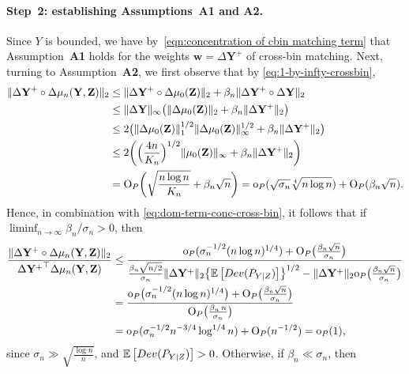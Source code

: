 \documentclass[12pt]{article}
\newcommand{\EE}[1]{\mathbb{E}\left[{#1}\right]}
\newcommand{\bY}{\mathbf{Y}}
\newcommand{\bZ}{\mathbf{Z}}
\newcommand{\bw}{\mathbf{w}}
\begin{document}
    \paragraph{Step~2: establishing Assumptions~\textbf{A1} and \textbf{A2}.}
    Since $Y$ is bounded, we have by~\eqref{eqn:concentration of cbin matching term} that Assumption~\textbf{A1} holds for the weights $\bw = \Delta\bY^+$ of cross-bin matching. Next, turning to Assumption~\textbf{A2}, we
    first observe that by \eqref{eq:1-by-infty-crossbin},
    \begin{align}\label{eq:cross_bin_DelY_Delmu_0_bd}
        \|\Delta\bY^+\circ \Delta\mu_n(\bY,\bZ)\|_2&\leq \|\Delta\bY^+\circ \Delta\mu_0(\bZ)\|_2+\beta_n\|\Delta\bY^+\circ \Delta\bY\|_2\notag\\
        &\leq \|\Delta\bY\|_\infty\bigl(\|\Delta\mu_0(\bZ)\|_2 +\beta_n\|\Delta\bY^+\|_2\bigr)\notag\\
        &\leq 2\bigl(\|\Delta\mu_0(\bZ)\|_1^{1/2}\|\Delta\mu_0(\bZ)\|_\infty^{1/2}+\beta_n\|\Delta\bY^+\|_2\bigr)\notag\\
        &\leq 2\biggl(\Bigl(\frac{4n}{K_n}\Bigr)^{1/2}\|\mu_0(\bZ)\|_\infty+\beta_n\|\Delta\bY^+\|_2\biggr)\notag\\
        &=\mathrm{O}_P\biggl(\sqrt{\frac{n \log n}{K_n}} + \beta_n\sqrt{n}\biggr) = \mathrm{o}_P(\sqrt{\sigma_n}\sqrt[4]{n\log n}) + \mathrm{O}_P(\beta_n\sqrt{n}).
    \end{align}
    Hence, in combination with \eqref{eq:dom-term-conc-cross-bin}, it follows that if $\liminf_{n\to\infty} \beta_n/\sigma_n>0$, then
    \begin{align*}
        \frac{\|\Delta\bY^+\circ \Delta\mu_n(\bY,\bZ)\|_2}{{\Delta\bY^+}^\top\Delta\mu_n(\bY,\bZ)}&\leq \frac{\mathrm{o}_P(\sigma_n^{-1/2}(n\log n)^{1/4})+\mathrm{O}_P\bigl( \frac{\beta_n\sqrt{n}}{\sigma_n}\bigr)}{\frac{\beta_n\sqrt{n/2}}{\sigma_n}\|\Delta\bY^+\|_2\bigl\{\EE{\textnormal{Dev}(P_{Y\mid Z})}\bigr\}^{1/2} - \|\Delta\bY^+\|_2\mathrm{o}_P\bigl( \frac{\beta_n\sqrt{n}}{\sigma_n}\bigr)} \\
        &= \frac{\mathrm{o}_P\bigl(\sigma_n^{-1/2}(n\log n)^{1/4}\bigr)+\mathrm{O}_P\bigl( \frac{\beta_n\sqrt{n}}{\sigma_n}\bigr)}{\mathrm{O}_P\bigl( \frac{\beta_n\,n}{\sigma_n}\bigr)} \\
        &= \mathrm{o}_P(\sigma_n^{-1/2}n^{-3/4} \log^{1/4} n) + \mathrm{O}_P(n^{-1/2}) = \mathrm{o}_P(1),
    \end{align*}
    since $\sigma_n\gg \sqrt{\frac{\log n}{n}}$, and $\EE{\textnormal{Dev}(P_{Y\mid Z})} > 0$. Otherwise, if $\beta_n\ll\sigma_n$, then
\end{document}
